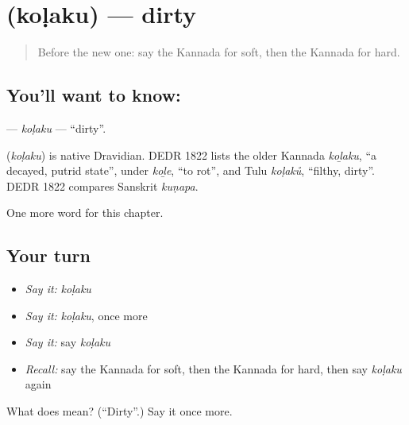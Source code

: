 \section[\texorpdfstring{\kn{ಕೊಳಕು} (koḷaku)}{ಕೊಳಕು (koḷaku)}]{ (koḷaku) — dirty}

\label{lesson:KA-C141-kolaku}



\begin{quote}
Before the new one: say the Kannada for soft, then the Kannada for hard.
\end{quote}

\subsection*{You'll want to know: }
\textbf{} — \emph{koḷaku} — \textquotedblleft{}dirty\textquotedblright{}.

\begin{cousinweb}
\textbf{} (\emph{koḷaku}) is native Dravidian. DEDR 1822 lists the older Kannada \emph{koḻaku}, \textquotedblleft{}a decayed, putrid state\textquotedblright{}, under \emph{koḻe}, \textquotedblleft{}to rot\textquotedblright{}, and Tulu \emph{koḷaků}, \textquotedblleft{}filthy, dirty\textquotedblright{}. DEDR 1822 compares Sanskrit \emph{kuṇapa}.
\end{cousinweb}

\begin{grammarlens}[title={What you've built}]
One more word for this chapter.
\end{grammarlens}

\subsection*{Your turn}
\begin{itemize}
\raggedright
  \item \emph{Say it:} \emph{koḷaku}
  \item \emph{Say it:} \emph{koḷaku}, once more
  \item \emph{Say it:} say \emph{koḷaku}
  \item \emph{Recall:} say the Kannada for soft, then the Kannada for hard, then say \emph{koḷaku} again
\end{itemize}

\begin{tcolorbox}[breakable,colback=teal!4,colframe=teal!35!black,title={Before you move on}]
What does  mean? (\textquotedblleft{}Dirty\textquotedblright{}.) Say it once more.
\end{tcolorbox}
